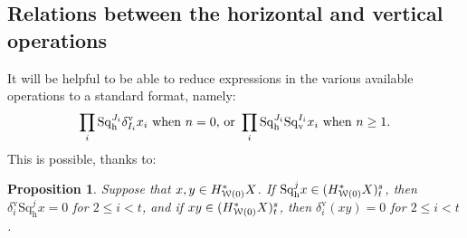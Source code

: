 \documentclass[11pt]{amsart} \renewcommand{\baselinestretch}{1.4}
\theoremstyle{plain}
\newtheorem{prop}[thm]{Proposition}
\theoremstyle{definition}
\newcommand{\calw}{\mathcal{W}}
\newcommand{\uver}{^\mathrm{v}}
\newcommand{\dver}{_\mathrm{v}}
\newcommand{\dhor}{_\mathrm{h}}
\newcommand{\Sqh}{\mathrm{Sq}\dhor}
\newcommand{\Sqv}{\mathrm{Sq}\dver}
\newcommand{\deltav}{\delta\uver}
\begin{document}
\begin{Cohomology Operations for W and U}
\subsection{Relations between the horizontal and vertical operations}
\label{Relations between the horizontal and vertical operations}
It will be helpful to be able to reduce %
expressions in the various available operations to a standard format, namely:
\[\prod_i \Sqh^{J_{i}}\deltav_{I_{i}}x_i\textup{ when $n=0$, or }\prod_i \Sqh^{J_{i}}\Sqv^{I_{i}}x_i\textup{ when $n\geq1$}.\]
This is possible, thanks to:
\begin{prop}
\label{rearrange horiz and vert ops}
Suppose that $x,y\in H^*_{\smash{\calw(0)}}X$. If $\Sqh^jx\in (H^*_{\smash{\calw(0)}}X)^{s}_{t}$, then $\deltav_i\Sqh^{j}x=0$ for  $2\leq i<t$, and if $xy\in (H^*_{\smash{\calw(0)}}X)^{s}_{t}$, then $\deltav_i(xy)=0$ for  $2\leq i<t$.


\end{prop}
\end{Cohomology Operations for W and U}
\end{document}
